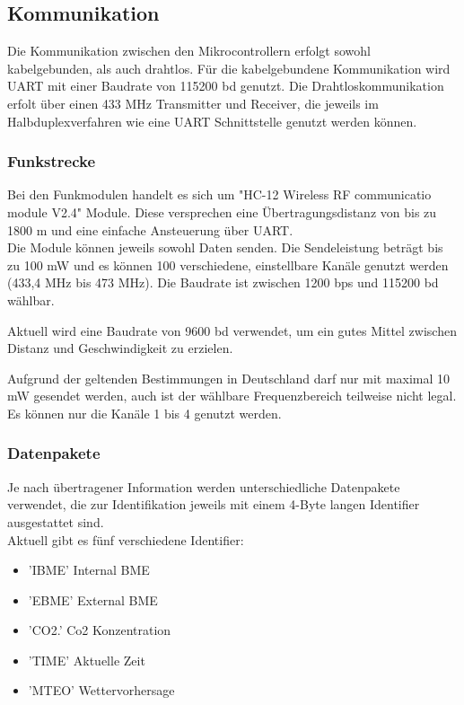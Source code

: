 \documentclass[a4paper,11pt]{article}
\begin{document}
\newpage
\subsection{Kommunikation}
\label{subsub:kommunikation}

Die Kommunikation zwischen den Mikrocontrollern erfolgt sowohl kabelgebunden, als auch drahtlos. Für die kabelgebundene Kommunikation wird UART mit einer Baudrate
von 115200 bd genutzt. Die Drahtloskommunikation erfolt über einen 433 MHz Transmitter und Receiver, die jeweils im Halbduplexverfahren wie eine UART Schnittstelle
genutzt werden können. 

\subsubsection{Funkstrecke}
\label{subsubsub:funkstrecke}

Bei den Funkmodulen handelt es sich um "HC-12 Wireless RF communicatio module V2.4" Module. Diese versprechen eine Übertragungsdistanz von bis zu 1800 m
und eine einfache Ansteuerung über UART. \\
Die Module können jeweils sowohl Daten senden. 
Die Sendeleistung beträgt bis zu 100 mW und es können 100 verschiedene, einstellbare Kanäle genutzt werden (433,4 MHz bis 473 MHz). Die Baudrate ist zwischen 
1200 bps und 115200 bd wählbar. 

\vspace{0.2cm}
\noindent
Aktuell wird eine Baudrate von 9600 bd verwendet, um ein gutes Mittel zwischen Distanz und Geschwindigkeit zu erzielen. 

\vspace{0.5cm}
\noindent
Aufgrund der geltenden Bestimmungen in Deutschland darf nur mit maximal 10 mW gesendet werden, auch ist der wählbare Frequenzbereich teilweise nicht legal.
Es können nur die Kanäle 1 bis 4 genutzt werden. 

\subsubsection{Datenpakete}
\label{subsubsub:datenpakete}

Je nach übertragener Information werden unterschiedliche Datenpakete verwendet, die zur Identifikation jeweils mit einem 4-Byte langen Identifier ausgestattet sind. \\
Aktuell gibt es fünf verschiedene Identifier:
\begin{itemize}
  \item 'IBME' Internal BME
  \item 'EBME' External BME
  \item 'CO2.' Co2 Konzentration
  \item 'TIME' Aktuelle Zeit
  \item 'MTEO' Wettervorhersage
\end{itemize}
\end{document}
